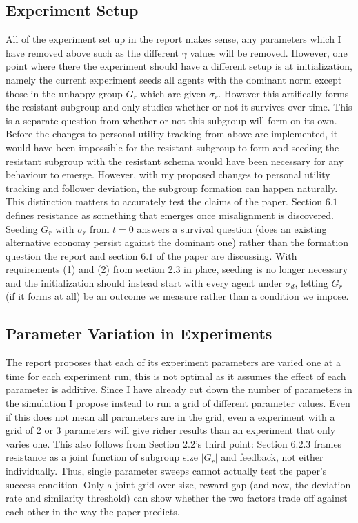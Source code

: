 \documentclass[12pt]{article}
\begin{document}
\subsection{Experiment Setup}
All of the experiment set up in the report makes sense, any parameters which I have removed above such as the different $\gamma$
values will be removed. However, one point where there the experiment should have a different setup is at initialization,
namely the current experiment seeds all agents with the dominant norm except those in the unhappy group $G_r$ which are given $\sigma_r$.
However this artifically forms the resistant subgroup and only studies whether or not it survives over time. This is a separate question
from whether or not this subgroup will form on its own. Before the changes to personal utility tracking from above are implemented,
it would have been impossible for the resistant subgroup to form and seeding the resistant subgroup with the resistant schema
would have been necessary for any behaviour to emerge. However, with my proposed changes to personal utility tracking and follower deviation,
the subgroup formation can happen naturally. This distinction matters to accurately test the claims of the paper. Section $6.1$
defines resistance as something that emerges once misalignment is discovered. Seeding $G_r$ with $\sigma_r$
from $t = 0$ answers a survival question (does an existing alternative economy persist against the dominant one)
rather than the formation question the report and section $6.1$ of the paper are discussing.
With requirements (1) and (2) from section 2.3 in place, seeding is no longer necessary and the initialization
should instead start with every agent under $\sigma_d$, letting $G_r$ (if it forms at all) be an outcome
we measure rather than a condition we impose.

\subsection{Parameter Variation in Experiments}
The report proposes that each of its experiment parameters are varied one at a time for each experiment run,
this is not optimal as it assumes the effect of each parameter is additive.
Since I have already cut down the number of parameters in the simulation I propose instead to run a grid of different parameter values.
Even if this does not mean all parameters are in the grid, even a experiment with a grid of 2 or 3 parameters
will give richer results than an experiment that only varies one. This also follows from Section 2.2's third point:
Section 6.2.3 frames resistance as a joint function of subgroup size $|G_r|$ and feedback, not either individually.
Thus, single parameter sweeps cannot actually test the paper's success condition. Only a joint grid
over size, reward-gap (and now, the deviation rate and similarity threshold) can show whether the two factors trade off against
each other in the way the paper predicts.
\end{document}
